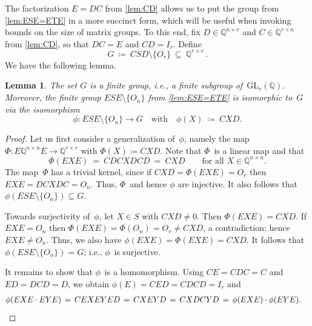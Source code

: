 \documentclass{lmcs}
\newtheorem{lemma}[thm]{Lemma}
\theoremstyle{definition}
\newcommand{\GL}{\mathrm{GL}}
\newcommand{\Q}{\mathbb{Q}}
\begin{document}
The factorization $E = D C$ from \cref{lem:CD} allows us to put the group from \cref{lem:ESE=ETE} in a more succinct form, which will be useful when invoking bounds on the size of matrix groups.
To this end, fix $D \in \Q^{n \times r}$ and $C \in \Q^{r \times n}$ from \cref{lem:CD}, so that $D C = E$ and $C D = I_r$.
Define
\[
 G \ \coloneqq \ C S D \setminus \{O_r\} \ \subseteq \ \Q^{r \times r}\,.
\]
We have the following lemma.
\begin{lemma} \label{lem:group-G}
The set $G$ is a finite group, i.e., a finite subgroup of~$\GL_r(\Q)$.
Moreover, the finite group $E S E \setminus \{O_n\}$ from \cref{lem:ESE=ETE} is isomorphic to~$G$ via the isomorphism 
\[
\phi : E S E \setminus \{O_n\} \to G \quad \text{with} \quad \phi(X) \ \coloneqq \ C X D.
\]
\end{lemma}
\begin{proof}
Let us first consider a generalization of~$\phi$, namely the map $\Phi : E \Q^{n \times n} E \to \Q^{r \times r}$ with $\Phi(X) \coloneqq C X D$.
Note that $\Phi$~is a linear map and that
\[
 \Phi(E X E) \ = \ C D C X D C D \ = \ C X D \qquad \text{for all $X \in \Q^{n \times n}$.}
\]
The map~$\Phi$ has a trivial kernel, since if $C X D = \Phi(E X E) = O_r$ then $E X E = D C X D C = O_n$.
Thus, $\Phi$~and hence $\phi$ are injective.
It also follows that $\phi(E S E \setminus \{O_n\}) \subseteq G$.

Towards surjectivity of~$\phi$, let $X \in S$ with $C X D \ne 0$.
Then $\Phi(E X E) = C X D$.
If $E X E = O_n$ then $\Phi(E X E) = \Phi(O_n) = O_r \ne C X D$, a contradiction; hence $E X E \ne O_n$.
Thus, we also have $\phi(E X E) = \Phi(E X E) = C X D$.
It follows that $\phi(E S E \setminus \{O_n\}) = G$; i.e., $\phi$~is surjective.

It remains to show that $\phi$~is a homomorphism.
Using $C E = C D C = C$ and $E D = D C D = D$, we obtain $\phi(E)   =  C E D  =  C D C D  =  I_r$ and
\begin{align*}
\phi(E X E \cdot E Y E)  & \, = \,  C E X E Y E D \, = \,  C X E Y D \, = \, C X D C Y D \, = \, \phi(E X E) \cdot \phi(E Y E). \qedhere
\end{align*}
\end{proof}
\end{document}
